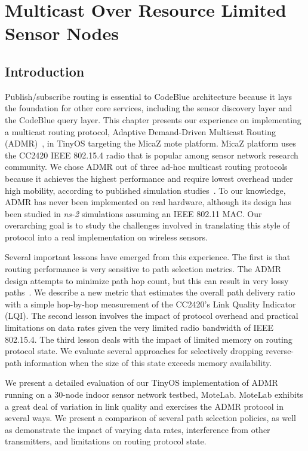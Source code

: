 \chapter{Multicast Over Resource Limited Sensor Nodes}
\label{chap-tinyadmr}

\section{Introduction}

Publish/subscribe routing is essential to CodeBlue architecture because it
lays the foundation for other core services, including the sensor discovery
layer and the CodeBlue query layer. This chapter presents our experience on
implementing a multicast routing protocol, Adaptive Demand-Driven Multicast
Routing (ADMR)~\cite{admr}, in TinyOS targeting the MicaZ mote platform. MicaZ
platform uses the CC2420 IEEE 802.15.4 radio that is popular among sensor
network research community. We chose ADMR out of three ad-hoc multicast
routing protocols because it achieves the highest performance and require lowest
overhead under high mobility, according to published simulation
studies~\cite{admr, maodv, odmrp}.
To our knowledge, ADMR has never been implemented on
real hardware, although its design has been studied in {\em ns-2} simulations
assuming an IEEE 802.11 MAC.  Our overarching goal is to study the challenges
involved in translating this style of protocol into a real implementation on
wireless sensors. 

Several important lessons have emerged from this experience. The first is
that routing performance is very sensitive to path selection metrics. The ADMR
design attempts to minimize path hop count, but this can result in very lossy
paths~\cite{etx,awoo-multihop}. We describe a new metric that estimates the
overall path delivery ratio with a simple hop-by-hop measurement of the
CC2420's Link Quality Indicator (LQI). The second lesson involves the impact
of protocol overhead and practical limitations on data rates given the very
limited radio bandwidth of IEEE 802.15.4. The third lesson deals with the
impact of limited memory on routing protocol state. We evaluate several
approaches for selectively dropping reverse-path information when the size of
this state exceeds memory availability.

We present a detailed evaluation of our TinyOS implementation of ADMR running
on a 30-node indoor sensor network testbed, MoteLab. MoteLab exhibits a great
deal of variation in link quality and exercises the ADMR protocol in several
ways. We present a comparison of several path selection policies, as well as
demonstrate the impact of varying data rates, interference from other
transmitters, and limitations on routing protocol state. 


